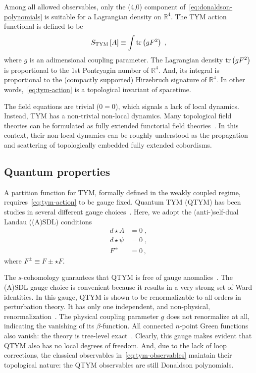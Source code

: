 \documentclass[../main/tex]{subfiles}
\begin{document}
Among all allowed observables, only the (4,0) component of~\eqref{eq:donaldson-polynomials} is suitable for a Lagrangian density on $ \mathbb{R}^4 $. The TYM action functional is defined to be
\begin{equation}\label{eq:tym-action}
  S_{\text{TYM}}\left[ A \right] \equiv  \int\operatorname{tr}\left( g F^2\right) \;,
\end{equation}
where $ g $ is an adimensional coupling parameter. The Lagrangian density $\operatorname{tr} \left(g F^2 \right)$ is proportional to the 1st Pontryagin number of $\mathbb{R}^4$. And, its integral is proportional to the (compactly supported) Hirzebruch signature of $\mathbb{R}^4$. In other words,~\eqref{eq:tym-action} is a topological  invariant of spacetime.

The field equations are trivial ($0=0$), which signals a lack of local dynamics. Instead, TYM has a non-trivial non-local dynamics. Many topological field theories can be formulated as fully extended functorial field theories~\cite{atiyah1988a,segal1988a,baez1995a,schreiber2009a,baez2009a}. In this context, their non-local dynamics can be roughly understood as the propagation and scattering of topologically embedded fully extended cobordisms.

\subsection{Quantum properties}\label{ssec:quantum-properties;sec:tym}

A partition function for TYM, formally defined in the weakly coupled regime, requires~\eqref{eq:tym-action} to be gauge fixed. Quantum TYM (QTYM) has been studies in several different gauge choices~\cite{baulieu1988a,myers1990c,brandhuber1994a,piguet1995a,sadovski2017c,sadovski2018a,sadovski2018b}. Here, we adopt the (anti-)self-dual Landau ((A)SDL) conditions
\begin{subequations}\label{eq:asdlg}
  \begin{align}
    d \star A    & = 0 \;, \\
    d \star \psi & = 0 \;, \\
    F^{\pm}      & = 0 \,,
  \end{align}
\end{subequations}
where $ F^{\pm} \equiv F \pm \star F $.

The $ s $-cohomology guarantees that QTYM is free of gauge anomalies~\cite{baulieu1988a}. The (A)SDL gauge choice is convenient because it results in a very strong set of Ward identities. In this gauge, QTYM is shown to be renormalizable to all orders in perturbation theory. It has only one independent, and non-physical, renormalization~\cite{sadovski2017c}. The physical coupling parameter $g$ does not renormalize at all, indicating the vanishing of its $\beta$-function. All connected $n$-point Green functions also vanish: the theory is tree-level exact~\cite{sadovski2018a}. Clearly, this gauge makes evident that QTYM also has no local degrees of freedom. And, due to the lack of loop corrections, the classical observables in~\eqref{eq:tym-observables} maintain their topological nature: the QTYM observables are still Donaldson polynomials.
\end{document}
